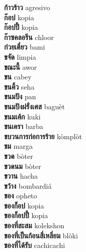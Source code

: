 \textbf{ ก้าวร้าว  } agresivo \\
\textbf{ ก๊อป  } kopia \\
\textbf{ ก๊อปปี้  } kopia \\
\textbf{ ก๊าซคลอรีน  } chloor \\
\textbf{ ก๋วยเตี๋ยว  } bami \\
\textbf{ ขจัด  } limpia \\
\textbf{ ขณะนี้  } awor \\
\textbf{ ขน  } cabey \\
\textbf{ ขนคิ้ว  } seha \\
\textbf{ ขนมปัง  } pan \\
\textbf{ ขนมปังฝรั่งเศส  } baguèt \\
\textbf{ ขนมเค้ก  } kuki \\
\textbf{ ขนเครา  } barba \\
\textbf{ ขบวนการก่อการร้าย  } kòmplòt \\
\textbf{ ขม  } marga \\
\textbf{ ขวด  } bòter \\
\textbf{ ขวดนม  } bòter \\
\textbf{ ขวาน  } hacha \\
\textbf{ ขว้าง  } bombardiá \\
\textbf{ ของ  } opheto \\
\textbf{ ของก็อป  } kopia \\
\textbf{ ของก็อปปี้  } kopia \\
\textbf{ ของที่สะสม  } kolekshon \\
\textbf{ ของที่เป็นก้อนสี่เหลี่ยม  } blòki \\
\textbf{ ของที่ได้รับ  } cachicachi \\
